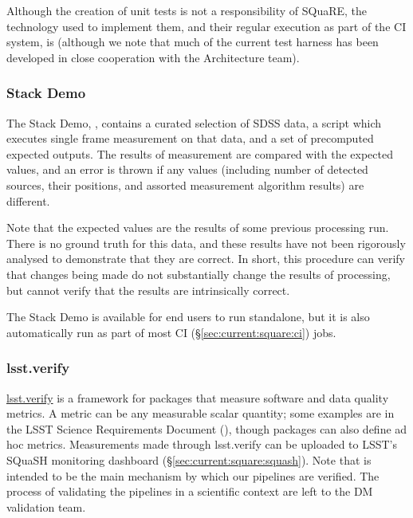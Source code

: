 \documentclass[DM,authoryear,toc,lsstdraft]{lsstdoc}
\begin{document}
Although the creation of unit tests is not a responsibility of SQuaRE, the
technology used to implement them, and their regular execution as part of the
CI system, is (although we note that much of the current test harness has been
developed in close cooperation with the Architecture team).

\subsubsection{Stack Demo}
\label{sec:current:square:demo}

The Stack Demo, , contains a curated
selection of SDSS data, a script which executes single frame measurement on
that data, and a set of precomputed expected outputs. The results of
measurement are compared with the expected values, and an error is thrown if
any values (including number of detected sources, their positions, and
assorted measurement algorithm results) are different.

Note that the expected values are the results of some previous processing run.
There is no ground truth for this data, and these results have not been
rigorously analysed to demonstrate that they are correct. In short, this
procedure can verify that changes being made do not substantially change the
results of processing, but cannot verify that the results are intrinsically
correct.

The Stack Demo is available for end users to run standalone, but it is also
automatically run as part of most CI (\S\ref{sec:current:square:ci}) jobs.

\subsubsection{lsst.verify}
\label{sec:current:square:verify}


\href{https://github.com/lsst/verify}{lsst.verify} is a framework for packages
that measure software and data quality \glspl{metric}. A metric can be any
measurable scalar quantity; some examples are in the LSST Science Requirements
Document (), though packages can also define ad hoc metrics.
Measurements made through lsst.verify can be uploaded to LSST's SQuaSH
monitoring dashboard (\S\ref{sec:current:square:squash}).  Note that 
is intended to be the main mechanism by which our pipelines are verified.
The process of validating the pipelines in a scientific context are left
to the DM validation team.
\end{document}
